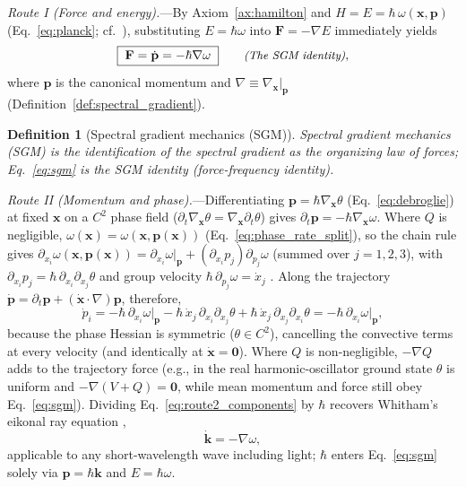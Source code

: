 \documentclass[aps,prd,onecolumn,tightenlines,nofootinbib,notitlepage,10pt,floatfix]{revtex4-2}
\theoremstyle{indentedtheorem}
\newtheorem{definition}{Definition}
\begin{document}
\emph{Route I (Force and energy).}---By Axiom~\ref{ax:hamilton} and $H=E=\hbar\,\omega(\mathbf{x},\mathbf{p})$ (Eq.~\eqref{eq:planck}; cf.~\citep{Lagrange1788Mecanique,Helmholtz1847Erhaltung}), substituting $E=\hbar\omega$ into $\mathbf{F}=-\nabla E$ immediately yields
\begin{equation}
    \boxed{\; \mathbf{F} = \dot{\mathbf{p}} = -\hbar\nabla\omega \;} \qquad \text{\small\itshape (The SGM identity)} ,
    \label{eq:sgm}
\end{equation}
where $\mathbf{p}$ is the canonical momentum and $\nabla\equiv\nabla_{\mathbf{x}}|_{\mathbf{p}}$ (Definition~\ref{def:spectral_gradient}).

\begin{definition}[Spectral gradient mechanics (SGM)]\label{def:sgm_def}
Spectral gradient mechanics (SGM) is the identification of the spectral gradient as the organizing law of forces; Eq.~\eqref{eq:sgm} is the \emph{SGM identity} (force-frequency identity).
\end{definition}

\emph{Route II (Momentum and phase).}---Differentiating $\mathbf{p}=\hbar\nabla_{\mathbf{x}}\theta$ (Eq.~\eqref{eq:debroglie}) at fixed $\mathbf{x}$ on a $C^2$ phase field ($\partial_t\nabla_{\mathbf{x}}\theta=\nabla_{\mathbf{x}}\partial_t\theta$) gives $\partial_t\mathbf{p}=-\hbar\nabla_{\mathbf{x}}\omega$. Where $Q$ is negligible, $\omega(\mathbf{x})=\omega(\mathbf{x},\mathbf{p}(\mathbf{x}))$ (Eq.~\eqref{eq:phase_rate_split}), so the chain rule gives $\partial_{x_i}\omega(\mathbf{x},\mathbf{p}(\mathbf{x}))=\partial_{x_i}\omega|_{\mathbf{p}}+(\partial_{x_i}p_j)\partial_{p_j}\omega$ (summed over $j=1,2,3$), with $\partial_{x_i}p_j=\hbar\,\partial_{x_i}\partial_{x_j}\theta$ and group velocity $\hbar\,\partial_{p_j}\omega=\dot{x}_j$ \citep{deBroglie1925Thesis}. Along the trajectory $\dot{\mathbf{p}}=\partial_t\mathbf{p}+(\dot{\mathbf{x}}\cdot\nabla)\mathbf{p}$, therefore,
\begin{equation}
    \dot{p}_i = -\hbar\,\partial_{x_i}\omega\big|_{\mathbf{p}} - \hbar\,\dot{x}_j\,\partial_{x_i}\partial_{x_j}\theta + \hbar\,\dot{x}_j\,\partial_{x_j}\partial_{x_i}\theta = -\hbar\,\partial_{x_i}\omega\big|_{\mathbf{p}} ,
    \label{eq:route2_components}
\end{equation}
because the phase Hessian is symmetric ($\theta\in C^2$), cancelling the convective terms at every velocity (and identically at $\dot{\mathbf{x}}=\mathbf{0}$). Where $Q$ is non-negligible, $-\nabla Q$ adds to the trajectory force (e.g., in the real harmonic-oscillator ground state $\theta$ is uniform and $-\nabla(V+Q)=\mathbf{0}$, while mean momentum and force still obey Eq.~\eqref{eq:sgm}). Dividing Eq.~\eqref{eq:route2_components} by $\hbar$ recovers Whitham's eikonal ray equation \citep{Whitham1974Linear,Evans1986Optics,Dodin2009Langmuir},
\begin{equation}
    \dot{\mathbf{k}} = -\nabla\omega ,
    \label{eq:eikonal_ray}
\end{equation}
applicable to any short-wavelength wave including light; $\hbar$ enters Eq.~\eqref{eq:sgm} solely via $\mathbf{p}=\hbar\mathbf{k}$ and $E=\hbar\omega$.
\end{document}
